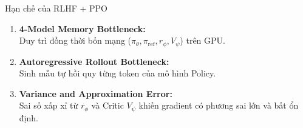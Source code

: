 \begin{frame}{Hạn chế của RLHF + PPO}
  \begin{enumerate}\setlength{\itemsep}{4pt}
    \item \textbf{4-Model Memory Bottleneck:}\\
      \small Duy trì đồng thời bốn mạng ($\pi_\theta, \pi_{\text{ref}}, r_\phi, V_\psi$) trên GPU.
    \item \textbf{Autoregressive Rollout Bottleneck:}\\
      \small Sinh mẫu tự hồi quy từng token của mô hình Policy.
    \item \textbf{Variance and Approximation Error:}\\
      \small Sai số xấp xỉ từ $r_\phi$ và Critic $V_\psi$ khiến gradient có phương sai lớn và bất ổn định.
  \end{enumerate}
  \par\vspace{0pt}
\end{frame}
